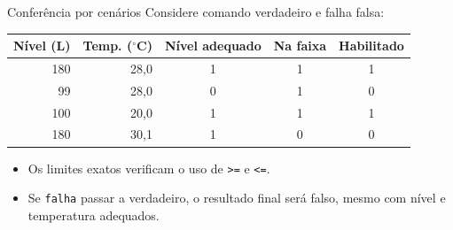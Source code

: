\begin{frame}{Conferência por cenários}
\small
Considere comando verdadeiro e falha falsa:
\begin{center}
\begin{tabular}{rrccc}
\toprule
Nível (L) & Temp. ($^\circ$C) & Nível adequado & Na faixa & Habilitado \\
\midrule
180 & 28,0 & 1 & 1 & 1 \\
99 & 28,0 & 0 & 1 & 0 \\
100 & 20,0 & 1 & 1 & 1 \\
180 & 30,1 & 1 & 0 & 0 \\
\bottomrule
\end{tabular}
\end{center}
\begin{itemize}
\item Os limites exatos verificam o uso de \texttt{>=} e \texttt{<=}.
\item Se \texttt{falha} passar a verdadeiro, o resultado final será falso, mesmo com nível e temperatura adequados.
\end{itemize}
\end{frame}
